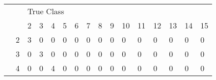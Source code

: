 \documentclass[12pt]{article}
\begin{document}
\begin{enumerate}
\begin{table}[H]
\begin{tabular}{@{}llllllllllllllll@{}}
                                                           &                            & \multicolumn{14}{l}{\cellcolor[HTML]{38FFF8}True Class}                                                                                                                                                                                                                                                                                                                                                     \\
                                                           &                            & \cellcolor[HTML]{38FFF8}2 & \cellcolor[HTML]{38FFF8}3 & \cellcolor[HTML]{38FFF8}4 & \cellcolor[HTML]{38FFF8}5 & \cellcolor[HTML]{38FFF8}6 & \cellcolor[HTML]{38FFF8}7 & \cellcolor[HTML]{38FFF8}8 & \cellcolor[HTML]{38FFF8}9 & \cellcolor[HTML]{38FFF8}10 & \cellcolor[HTML]{38FFF8}11 & \cellcolor[HTML]{38FFF8}12 & \cellcolor[HTML]{38FFF8}13 & \cellcolor[HTML]{38FFF8}14 & \cellcolor[HTML]{38FFF8}15 \\
\cellcolor[HTML]{34FF34}                                   & \cellcolor[HTML]{34FF34}2  & 3                         & 0                         & 0                         & 0                         & 0                         & 0                         & 0                         & 0                         & 0                          & 0                          & 0                          & 0                          & 0                          & 0                          \\
\cellcolor[HTML]{34FF34}                                   & \cellcolor[HTML]{34FF34}3  & 0                         & 3                         & 0                         & 0                         & 0                         & 0                         & 0                         & 0                         & 0                          & 0                          & 0                          & 0                          & 0                          & 0                          \\
\cellcolor[HTML]{34FF34}                                   & \cellcolor[HTML]{34FF34}4  & 0                         & 0                         & 4                         & 0                         & 0                         & 0                         & 0                         & 0                         & 0                          & 0                          & 0                          & 0                          & 0                          & 0                          \\

\end{tabular}
\end{table}
\end{enumerate}
\end{document}
